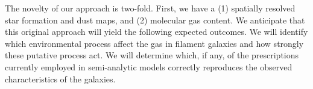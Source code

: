 \documentclass[11pt, preprint]{aastex}
\begin{document}

The novelty of our approach is two-fold.  First, we have a (1)
spatially resolved star formation and dust maps, and (2) molecular
gas content.
We anticipate that this original approach will yield the following
expected outcomes.  We will identify which environmental process
affect the gas in filament galaxies and how strongly these putative process act.  We will determine which, if any, of the prescriptions currently employed in semi-analytic models correctly reproduces the observed characteristics of the galaxies.  %


\end{document}
